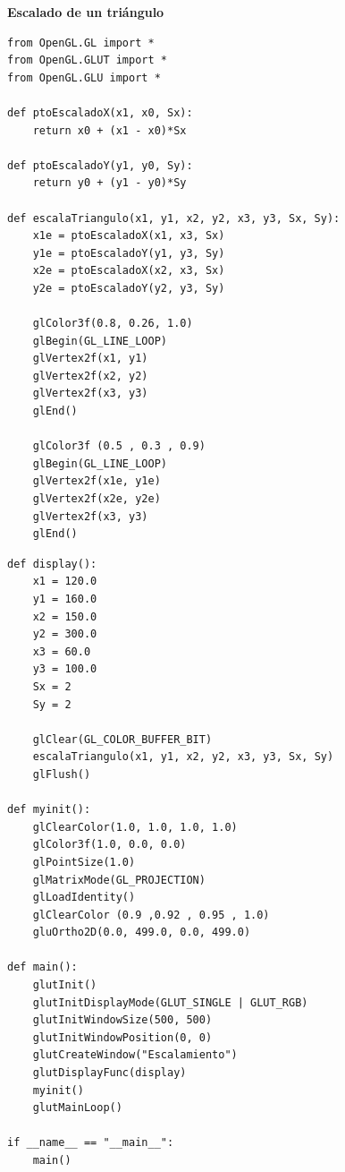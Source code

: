\documentclass[a4paper]{article}
\begin{document}
\restoregeometry
\newpage

\Large{\textbf{Escalado de un triángulo}}\\[-0.4cm]
\begin{center}
\begin{mycodeboxl}
\begin{lstlisting}
from OpenGL.GL import *
from OpenGL.GLUT import *
from OpenGL.GLU import *

def ptoEscaladoX(x1, x0, Sx):
    return x0 + (x1 - x0)*Sx

def ptoEscaladoY(y1, y0, Sy):
    return y0 + (y1 - y0)*Sy

def escalaTriangulo(x1, y1, x2, y2, x3, y3, Sx, Sy):
    x1e = ptoEscaladoX(x1, x3, Sx)
    y1e = ptoEscaladoY(y1, y3, Sy)
    x2e = ptoEscaladoX(x2, x3, Sx)
    y2e = ptoEscaladoY(y2, y3, Sy)

    glColor3f(0.8, 0.26, 1.0)
    glBegin(GL_LINE_LOOP)
    glVertex2f(x1, y1)
    glVertex2f(x2, y2)
    glVertex2f(x3, y3)
    glEnd()

    glColor3f (0.5 , 0.3 , 0.9)
    glBegin(GL_LINE_LOOP)
    glVertex2f(x1e, y1e)
    glVertex2f(x2e, y2e)
    glVertex2f(x3, y3)
    glEnd()
\end{lstlisting}
\end{mycodeboxl}
\end{center}
\newpage
\begin{center}
\begin{mycodeboxl}
\begin{lstlisting}
def display():
    x1 = 120.0
    y1 = 160.0
    x2 = 150.0
    y2 = 300.0
    x3 = 60.0
    y3 = 100.0
    Sx = 2
    Sy = 2

    glClear(GL_COLOR_BUFFER_BIT)
    escalaTriangulo(x1, y1, x2, y2, x3, y3, Sx, Sy)
    glFlush()

def myinit():
    glClearColor(1.0, 1.0, 1.0, 1.0)
    glColor3f(1.0, 0.0, 0.0)
    glPointSize(1.0)
    glMatrixMode(GL_PROJECTION)
    glLoadIdentity()
    glClearColor (0.9 ,0.92 , 0.95 , 1.0)
    gluOrtho2D(0.0, 499.0, 0.0, 499.0)

def main():
    glutInit()
    glutInitDisplayMode(GLUT_SINGLE | GLUT_RGB)
    glutInitWindowSize(500, 500)
    glutInitWindowPosition(0, 0)
    glutCreateWindow("Escalamiento")
    glutDisplayFunc(display)
    myinit()
    glutMainLoop()

if __name__ == "__main__":
    main()
\end{lstlisting}
\end{mycodeboxl}
\end{center}
\end{document}
